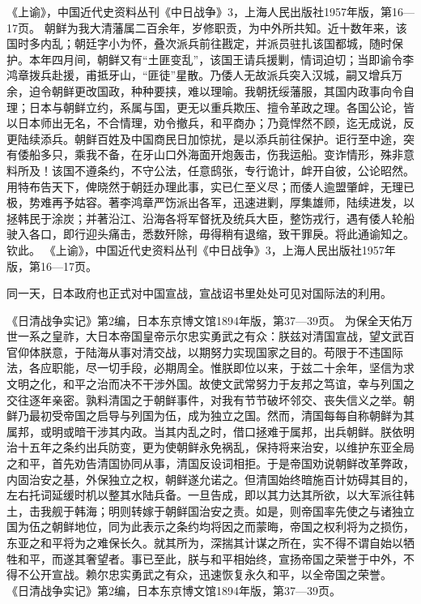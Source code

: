 \documentclass[12pt,UTF8]{ctexbook}
\begin{document}
《上谕》，中国近代史资料丛刊《中日战争》3，上海人民出版社1957年版，第16—17页。
朝鲜为我大清藩属二百余年，岁修职贡，为中外所共知。近十数年来，该国时多内乱；朝廷字小为怀，叠次派兵前往戡定，并派员驻扎该国都城，随时保护。本年四月间，朝鲜又有“土匪变乱”，该国王请兵援剿，情词迫切；当即谕令李鸿章拨兵赴援，甫抵牙山，“匪徒”星散。乃倭人无故派兵突入汉城，嗣又增兵万余，迫令朝鲜更改国政，种种要挟，难以理喻。我朝抚绥藩服，其国内政事向令自理；日本与朝鲜立约，系属与国，更无以重兵欺压、擅令革政之理。各国公论，皆以日本师出无名，不合情理，劝令撤兵，和平商办；乃竟悍然不顾，迄无成说，反更陆续添兵。朝鲜百姓及中国商民日加惊扰，是以添兵前往保护。讵行至中途，突有倭船多只，乘我不备，在牙山口外海面开炮轰击，伤我运船。变诈情形，殊非意料所及！该国不遵条约，不守公法，任意鸱张，专行诡计，衅开自彼，公论昭然。用特布告天下，俾晓然于朝廷办理此事，实已仁至义尽；而倭人逾盟肇衅，无理已极，势难再予姑容。著李鸿章严饬派出各军，迅速进剿，厚集雄师，陆续进发，以拯韩民于涂炭；并著沿江、沿海各将军督抚及统兵大臣，整饬戎行，遇有倭人轮船驶入各口，即行迎头痛击，悉数歼除，毋得稍有退缩，致干罪戾。将此通谕知之。钦此。 《上谕》，中国近代史资料丛刊《中日战争》3，上海人民出版社1957年版，第16—17页。

同一天，日本政府也正式对中国宣战，宣战诏书里处处可见对国际法的利用。

《日清战争实记》第2编，日本东京博文馆1894年版，第37—39页。
为保全天佑万世一系之皇祚，大日本帝国皇帝示尔忠实勇武之有众：朕兹对清国宣战，望文武百官仰体朕意，于陆海从事对清交战，以期努力实现国家之目的。苟限于不违国际法，各应职能，尽一切手段，必期周全。惟朕即位以来，于兹二十余年，坚信为求文明之化，和平之治而决不干涉外国。故使文武常努力于友邦之笃谊，幸与列国之交往逐年亲密。孰料清国之于朝鲜事件，对我有节节破坏邻交、丧失信义之举。朝鲜乃最初受帝国之启导与列国为伍，成为独立之国。然而，清国每每自称朝鲜为其属邦，或明或暗干涉其内政。当其内乱之时，借口拯难于属邦，出兵朝鲜。朕依明治十五年之条约出兵防变，更为使朝鲜永免祸乱，保持将来治安，以维护东亚全局之和平，首先劝告清国协同从事，清国反设词相拒。于是帝国劝说朝鲜改革弊政，内固治安之基，外保独立之权，朝鲜遂允诺之。但清国始终暗施百计妨碍其目的，左右托词延缓时机以整其水陆兵备。一旦告成，即以其力达其所欲，以大军派往韩土，击我舰于韩海；明则转嫁于朝鲜国治安之责。如是，则帝国率先使之与诸独立国为伍之朝鲜地位，同为此表示之条约均将因之而蒙晦，帝国之权利将为之损伤，东亚之和平将为之难保长久。就其所为，深揣其计谋之所在，实不得不谓自始以牺牲和平，而遂其奢望者。事已至此，朕与和平相始终，宣扬帝国之荣誉于中外，不得不公开宣战。赖尔忠实勇武之有众，迅速恢复永久和平，以全帝国之荣誉。 《日清战争实记》第2编，日本东京博文馆1894年版，第37—39页。
\end{document}
